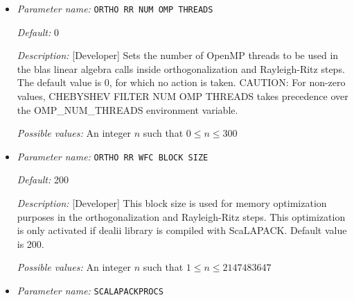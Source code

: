 \begin{itemize}
{\it Possible values:} Any one of GS, LW, PGS
\item {\it Parameter name:} {\tt ORTHO RR NUM OMP THREADS}
\label{parameters:SCF parameters/Eigen_2dsolver_2fChebyshev solver related parameters/ORTHO RR NUM OMP THREADS}
\label{parameters:SCF_20parameters/Eigen_2dsolver_2fChebyshev_20solver_20related_20parameters/ORTHO_20RR_20NUM_20OMP_20THREADS}




{\it Default:} 0


{\it Description:} [Developer] Sets the number of OpenMP threads to be used in the blas linear algebra calls inside orthogonalization and Rayleigh-Ritz steps. The default value is 0, for which no action is taken. CAUTION: For non-zero values, CHEBYSHEV FILTER NUM OMP THREADS takes precedence over the OMP\_NUM\_THREADS environment variable.


{\it Possible values:} An integer $n$ such that $0\leq n \leq 300$
\item {\it Parameter name:} {\tt ORTHO RR WFC BLOCK SIZE}
\label{parameters:SCF parameters/Eigen_2dsolver_2fChebyshev solver related parameters/ORTHO RR WFC BLOCK SIZE}
\label{parameters:SCF_20parameters/Eigen_2dsolver_2fChebyshev_20solver_20related_20parameters/ORTHO_20RR_20WFC_20BLOCK_20SIZE}




{\it Default:} 200


{\it Description:} [Developer] This block size is used for memory optimization purposes in the orthogonalization and Rayleigh-Ritz steps. This optimization is only activated if dealii library is compiled with ScaLAPACK. Default value is 200.


{\it Possible values:} An integer $n$ such that $1\leq n \leq 2147483647$
\item {\it Parameter name:} {\tt SCALAPACKPROCS}
\label{parameters:SCF parameters/Eigen_2dsolver_2fChebyshev solver related parameters/SCALAPACKPROCS}
\label{parameters:SCF_20parameters/Eigen_2dsolver_2fChebyshev_20solver_20related_20parameters/SCALAPACKPROCS}





\end{itemize}
